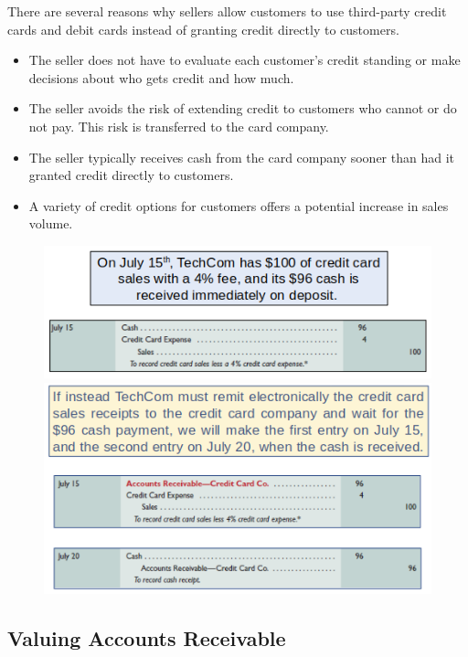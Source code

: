 \documentclass[../main.tex]{subfiles}
\begin{document}
	There are several reasons why sellers allow customers to use third-party 
	credit cards and debit cards instead of granting credit directly to 
	customers. 
	\begin{itemize}[noitemsep]
		\item The seller does not have to evaluate each customer’s 
		credit standing or make decisions about who gets credit and how much.
		\item The seller avoids the risk of extending credit to customers who 
		cannot or do not pay. This risk is transferred to the card company.
		\item The seller typically receives cash from the card company sooner 
		than had it granted credit directly to customers.
		\item A variety of credit options 
		for customers offers a potential increase in sales volume.
	\end{itemize}
	
	\begin{figure}[ht]
		\centering
		\includegraphics[width=\columnwidth]{images/c6/credit_card_eg.png}
		\includegraphics[width=\columnwidth]{images/c6/credit_card_eg2.png}
	\end{figure}
	
	\subsection{Valuing Accounts Receivable}
	
\end{document}
